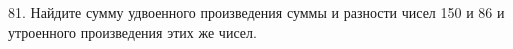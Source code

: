 81. Найдите сумму удвоенного произведения суммы и разности чисел 150 и 86 и утроенного произведения этих же чисел.\\
